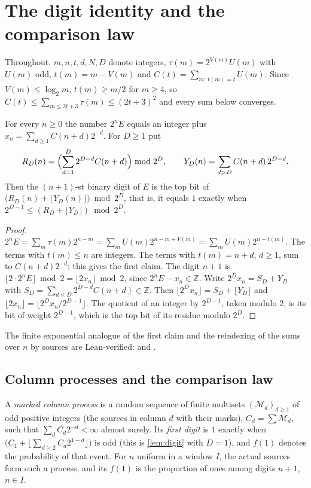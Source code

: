 \documentclass[11pt]{article}
\begin{document}
\section{The digit identity and the comparison law}\label{sec:model}

Throughout, $m,n,t,d,N,D$ denote integers, $\tau(m)=2^{V(m)}U(m)$ with $U(m)$ odd, $t(m)=m-V(m)$ and $C(t)=\sum_{m:\,t(m)=t}U(m)$. Since $V(m)\le\log_2m$, $t(m)\ge m/2$ for $m\ge4$, so $C(t)\le\sum_{m\le2t+3}\tau(m)\le(2t+3)^2$ and every sum below converges.

\begin{lemma}\label{lem:digit}
For every $n\ge0$ the number $2^nE$ equals an integer plus $x_n=\sum_{d\ge1}C(n+d)2^{-d}$. For $D\ge1$ put
\[
R_D(n)=\Bigl(\sum_{d=1}^{D}2^{D-d}C(n+d)\Bigr)\bmod 2^D,\qquad
Y_D(n)=\sum_{d>D}C(n+d)\,2^{D-d}.
\]
Then the $(n{+}1)$-st binary digit of $E$ is the top bit of $\bigl(R_D(n)+\lfloor Y_D(n)\rfloor\bigr)\bmod 2^D$, that is, it equals $1$ exactly when $2^{D-1}\le (R_D+\lfloor Y_D\rfloor)\bmod 2^D$.
\end{lemma}

\begin{proof}
$2^nE=\sum_m\tau(m)2^{n-m}=\sum_mU(m)2^{n-m+V(m)}=\sum_mU(m)2^{n-t(m)}$. The terms with $t(m)\le n$ are integers. The terms with $t(m)=n+d$, $d\ge1$, sum to $C(n+d)2^{-d}$; this gives the first claim. The digit $n{+}1$ is $\lfloor2\cdot2^nE\rfloor\bmod2=\lfloor2x_n\rfloor\bmod2$, since $2^nE-x_n\in\mathbb Z$. Write $2^Dx_n=S_D+Y_D$ with $S_D=\sum_{d\le D}2^{D-d}C(n+d)\in\mathbb Z$. Then $\lfloor2^Dx_n\rfloor=S_D+\lfloor Y_D\rfloor$ and $\lfloor2x_n\rfloor=\lfloor2^Dx_n/2^{D-1}\rfloor$. The quotient of an integer by $2^{D-1}$, taken modulo $2$, is its bit of weight $2^{D-1}$, which is the top bit of its residue modulo $2^D$.
\end{proof}

The finite exponential analogue of the first claim and the reindexing of the sums over $n$ by sources are Lean-verified:  and .

\subsection{Column processes and the comparison law}

A \emph{marked column process} is a random sequence of finite multisets $(\mathcal M_d)_{d\ge1}$ of odd positive integers (the sources in column $d$ with their marks), $C_d=\sum\mathcal M_d$, such that $\sum_dC_d2^{-d}<\infty$ almost surely. Its \emph{first digit} is $1$ exactly when $\bigl(C_1+\lfloor\sum_{d\ge2}C_d2^{1-d}\rfloor\bigr)$ is odd (this is \cref{lem:digit} with $D=1$), and $f(1)$ denotes the probability of that event. For $n$ uniform in a window $I$, the actual sources form such a process, and its $f(1)$ is the proportion of ones among digits $n{+}1$, $n\in I$.
\end{document}
